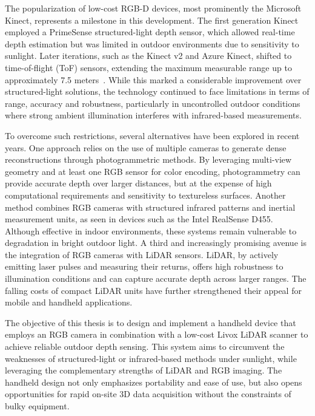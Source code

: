 \documentclass[english, bachelor, utf8]{base/thesis_telematics}
\begin{document}
The popularization of low-cost RGB-D devices, most prominently the Microsoft Kinect, represents a milestone 
in this development. The first generation Kinect employed a PrimeSense structured-light depth sensor, which 
allowed real-time depth estimation but was limited in outdoor environments due to sensitivity to sunlight. 
Later iterations, such as the Kinect v2 and Azure Kinect, shifted to time-of-flight (ToF) sensors, extending 
the maximum measurable range up to approximately 7.5 meters~\cite{3dpclecture}. While this marked a considerable 
improvement over structured-light solutions, the technology continued to face limitations in terms of range, 
accuracy and robustness, particularly in uncontrolled outdoor conditions where strong ambient illumination 
interferes with infrared-based measurements.

To overcome such restrictions, several alternatives have been explored in recent years. One approach relies 
on the use of multiple cameras to generate dense reconstructions through photogrammetric methods. By leveraging 
multi-view geometry and at least one RGB sensor for color encoding, photogrammetry can provide accurate depth 
over larger distances, but at the expense of high computational requirements and sensitivity to textureless 
surfaces. Another method combines RGB cameras with structured infrared patterns and inertial measurement units, 
as seen in devices such as the Intel RealSense D455. Although effective in indoor environments, these systems 
remain vulnerable to degradation in bright outdoor light. A third and increasingly promising avenue is the 
integration of RGB cameras with LiDAR sensors. LiDAR, by actively emitting laser pulses and measuring their 
returns, offers high robustness to illumination conditions and can capture accurate depth across larger ranges. 
The falling costs of compact LiDAR units have further strengthened their appeal for mobile and handheld 
applications.

The objective of this thesis is to design and implement a handheld device that employs an RGB camera in 
combination with a low-cost Livox LiDAR scanner to achieve reliable outdoor depth sensing. This system aims 
to circumvent the weaknesses of structured-light or infrared-based methods under sunlight, while leveraging 
the complementary strengths of LiDAR and RGB imaging. The handheld design not only emphasizes portability 
and ease of use, but also opens opportunities for rapid on-site 3D data acquisition without the constraints 
of bulky equipment.
\end{document}
